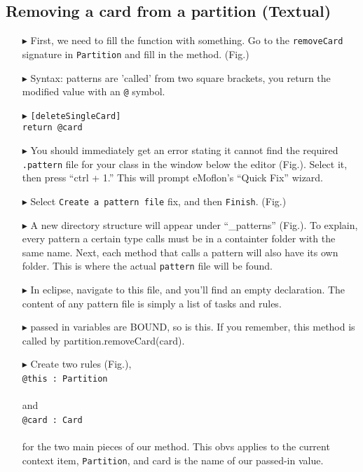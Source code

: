 \newpage
\subsection{Removing a card from a partition (Textual)}
\texHeader
\hypertarget{remCard tex}{}

\begin{itemize}

\item[$\blacktriangleright$] First, we need to fill the function with something. Go to the \texttt{removeCard} signature in \texttt{Partition} and fill in the
method. (Fig.)

\item[$\blacktriangleright$] Syntax: patterns are 'called' from two square brackets, you return the modified value with an \texttt{@} symbol.

\item[$\blacktriangleright$] \texttt{[deleteSingleCard] \\ return @card }

\item[$\blacktriangleright$] You should immediately get an error stating it cannot find the required \texttt{.pattern} file for your class in the window below
the editor (Fig.). Select it, then press ``ctrl + 1.'' This will prompt eMoflon's ``Quick Fix'' wizard.

\item[$\blacktriangleright$] Select \texttt{Create a pattern file} fix, and then \texttt{Finish}. (Fig.)

\item[$\blacktriangleright$] A new directory structure will appear under ``\_patterns'' (Fig.). To explain, every pattern a certain type calls must be in a
containter folder with the same name. Next, each method that calls a pattern will also have its own folder. This is where the actual \texttt{pattern} file will be found.

\item[$\blacktriangleright$] In eclipse, navigate to this file, and you'll find an empty declaration. The content of any pattern file is simply a list of tasks
and rules.

\item[$\blacktriangleright$] passed in variables are BOUND, so is this. If you remember, this method is called by partition.removeCard(card). 

\item[$\blacktriangleright$] Create two rules (Fig.),\\ \texttt{@this : Partition { \\ }} \\ and \\ \texttt{@card : Card { \\ }} \\ for the two main pieces of
our method. This obvs applies to the current context item, \texttt{Partition}, and card is the name of our passed-in value.


\end{itemize}
